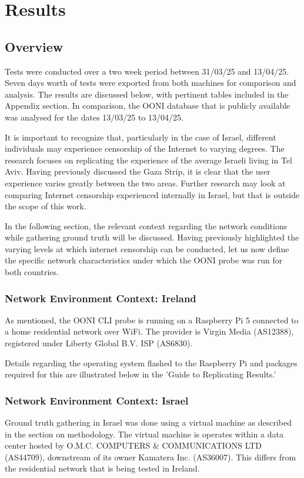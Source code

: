\chapter{Results}
\section{Overview}
Tests were conducted over a two week period between 31/03/25 and 13/04/25. Seven days worth of tests were exported from both machines for comparison and analysis. The results are discussed below, with pertinent tables included in the Appendix section. In comparison, the OONI database that is publicly available was analysed for the dates 13/03/25 to 13/04/25. 

It is important to recognize that, particularly in the case of Israel, different individuals may experience censorship of the Internet to varying degrees. The research focuses on replicating the experience of the average Israeli living in Tel Aviv. Having previously discussed the Gaza Strip, it is clear that the user experience varies greatly between the two areas. Further research may look at comparing Internet censorship experienced internally in Israel, but that is outside the scope of this work.

In the following section, the relevant context regarding the network conditions while gathering ground truth will be discussed. Having previously highlighted the varying levels at which internet censorship can be conducted, let us now define the specific network characteristics under which the OONI probe was run for both countries.

\subsection{Network Environment Context: Ireland}
As mentioned, the OONI CLI probe is running on a Raspberry Pi 5 connected to a home residential network over WiFi. The provider is Virgin Media (AS12388), registered under Liberty Global B.V. ISP (AS6830). 

Details regarding the operating system flashed to the Raspberry Pi and packages required for this are illustrated below in the 'Guide to Replicating Results.' 

\subsection{Network Environment Context: Israel}
Ground truth gathering in Israel was done using a virtual machine as described in the section on methodology. The virtual machine is operates within a data center hosted by O.M.C. COMPUTERS \& COMMUNICATIONS LTD (AS44709), downstream of its owner Kamatera Inc. (AS36007). This differs from the residential network that is being tested in Ireland.


